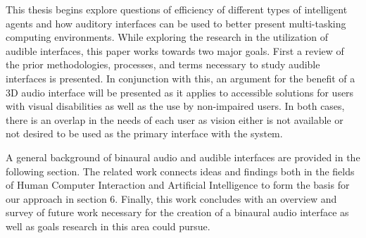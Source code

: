 This thesis begins explore questions of efficiency of different types of intelligent
agents and how auditory interfaces can be used to better present multi-tasking 
computing environments. While exploring the research in the utilization of audible 
interfaces, this paper works towards two major goals. First a review of the prior 
methodologies, processes, and terms necessary to study audible interfaces is 
presented. In conjunction with this, an argument for the benefit of a 3D audio 
interface will be presented as it applies to accessible solutions for users with
visual disabilities as well as the use by non-impaired users. In both cases, there
is an overlap in the needs of each user as vision either is not available or not 
desired to be used as the primary interface with the system.


A general background of binaural audio and audible interfaces are provided in 
the following section. The related work connects ideas and findings both in the
fields of Human Computer Interaction and Artificial Intelligence to form the 
basis for our approach in section 6. Finally, this work concludes with an
overview and survey of future work necessary for the creation of a binaural 
audio interface as well as goals research in this area could pursue.
